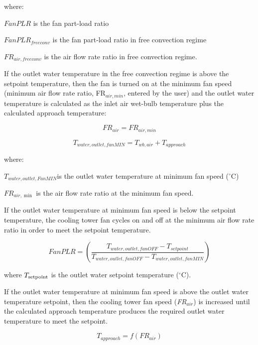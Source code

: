 where:

\(FanPLR\) is the fan part-load ratio

\(FanPL{R_{freeconv}}\) is the fan part-load ratio in free convection regime

\(F{R_{air,freeconv}}\) is the air flow rate ratio in free convection regime.

If the outlet water temperature in the free convection regime is above the setpoint temperature, then the fan is turned on at the minimum fan speed (minimum air flow rate ratio, FR\(_{air,min}\), entered by the user) and the outlet water temperature is calculated as the inlet air wet-bulb temperature plus the calculated approach temperature:

\begin{equation}
FR_{air} = FR_{air,min}
\end{equation}

\begin{equation}
T_{water,outlet,fanMIN} = T_{wb,air} + T_{approach}
\end{equation}

where:

\({T_{water,outlet,FanMIN}}\)is the outlet water temperature at minimum fan speed (\(^{\circ}\)C)

\(F{R_{air,\min }}\) is the air flow rate ratio at the minimum fan speed.

If the outlet water temperature at minimum fan speed is below the setpoint temperature, the cooling tower fan cycles on and off at the minimum air flow rate ratio in order to meet the setpoint temperature.

\begin{equation}
FanPLR = \left( {\frac{{{T_{water,outlet,fanOFF}} - {T_{setpoint}}}}{{{T_{water,outlet,fanOFF}} - {T_{water,outlet,fanMIN}}}}} \right)
\end{equation}

where \({T_{{\rm{setpoint}}}}\) is the outlet water setpoint temperature (\(^{\circ}\)C).

If the outlet water temperature at minimum fan speed is above the outlet water temperature setpoint, then the cooling tower fan speed (\emph{FR\(_{air}\)}) is increased until the calculated approach temperature produces the required outlet water temperature to meet the setpoint.

\begin{equation}
{T_{approach}} = f\left( {F{R_{air}}} \right)
\end{equation}

